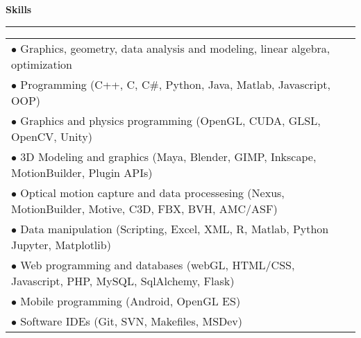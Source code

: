 \needspace{6em}
{\large {\bf Skills}}
\vspace{0.1cm}
\hrule
\begin{tabular*}{7.1in}{@{}l@{\extracolsep\fill}r}
\noindent
$\bullet$ Graphics, geometry, data analysis and modeling, linear algebra, optimization\\
$\bullet$ Programming (C++, C, C\#, Python, Java, Matlab, Javascript, OOP)\\
$\bullet$ Graphics and physics programming (OpenGL, CUDA, GLSL, OpenCV, Unity)\\
$\bullet$ 3D Modeling and graphics (Maya, Blender, GIMP, Inkscape, MotionBuilder, Plugin APIs)\\
$\bullet$ Optical motion capture and data processesing (Nexus, MotionBuilder, Motive, C3D, FBX, BVH, AMC/ASF)\\
$\bullet$ Data manipulation (Scripting, Excel, XML, R, Matlab, Python Jupyter, Matplotlib)\\
$\bullet$ Web programming and databases (webGL, HTML/CSS, Javascript, PHP, MySQL, SqlAlchemy, Flask)\\
$\bullet$ Mobile programming (Android, OpenGL ES)\\
$\bullet$ Software IDEs (Git, SVN, Makefiles, MSDev)\\
\end{tabular*}

